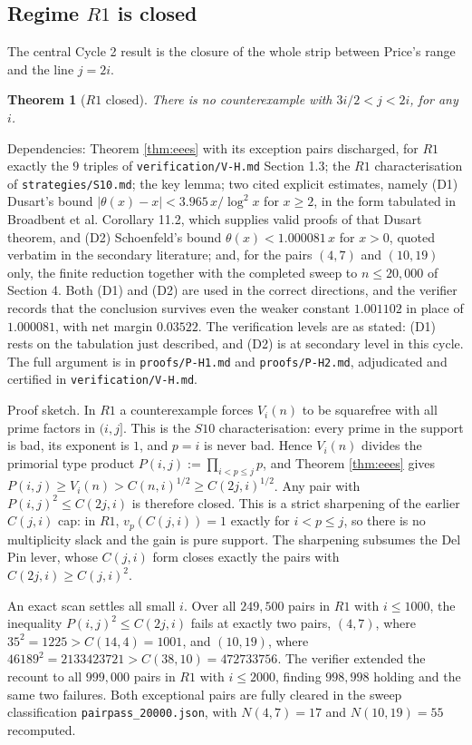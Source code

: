 \documentclass[11pt]{article}
\newtheorem{theorem}{Theorem}[section]
\theoremstyle{remark}
\begin{document}
\subsection{Regime $R1$ is closed}

The central Cycle 2 result is the closure of the whole strip between Price's range and the line $j=2i$.

\begin{theorem}[$R1$ closed]
\label{thm:R1}
There is no counterexample with $3i/2<j<2i$, for any $i$.
\end{theorem}

Dependencies: Theorem \ref{thm:eees} with its exception pairs discharged, for $R1$ exactly the $9$ triples of \texttt{verification/V-H.md} Section 1.3; the $R1$ characterisation of \texttt{strategies/S10.md}; the key lemma; two cited explicit estimates, namely (D1) Dusart's bound $|\theta(x)-x|<3.965\,x/\log^2 x$ for $x\ge 2$, in the form tabulated in Broadbent et al. Corollary 11.2, which supplies valid proofs of that Dusart theorem, and (D2) Schoenfeld's bound $\theta(x)<1.000081\,x$ for $x>0$, quoted verbatim in the secondary literature; and, for the pairs $(4,7)$ and $(10,19)$ only, the finite reduction together with the completed sweep to $n\le 20{,}000$ of Section 4. Both (D1) and (D2) are used in the correct directions, and the verifier records that the conclusion survives even the weaker constant $1.001102$ in place of $1.000081$, with net margin $0.03522$. The verification levels are as stated: (D1) rests on the tabulation just described, and (D2) is at secondary level in this cycle. The full argument is in \texttt{proofs/P-H1.md} and \texttt{proofs/P-H2.md}, adjudicated and certified in \texttt{verification/V-H.md}.

Proof sketch. In $R1$ a counterexample forces $V_i(n)$ to be squarefree with all prime factors in $(i,j]$. This is the $S10$ characterisation: every prime in the support is bad, its exponent is $1$, and $p=i$ is never bad. Hence $V_i(n)$ divides the primorial type product $P(i,j):=\prod_{i<p\le j}p$, and Theorem \ref{thm:eees} gives $P(i,j)\ge V_i(n)>C(n,i)^{1/2}\ge C(2j,i)^{1/2}$. Any pair with $P(i,j)^2\le C(2j,i)$ is therefore closed. This is a strict sharpening of the earlier $C(j,i)$ cap: in $R1$, $v_p(C(j,i))=1$ exactly for $i<p\le j$, so there is no multiplicity slack and the gain is pure support. The sharpening subsumes the Del Pin lever, whose $C(j,i)$ form closes exactly the pairs with $C(2j,i)\ge C(j,i)^2$.

An exact scan settles all small $i$. Over all $249{,}500$ pairs in $R1$ with $i\le 1000$, the inequality $P(i,j)^2\le C(2j,i)$ fails at exactly two pairs, $(4,7)$, where $35^2=1225>C(14,4)=1001$, and $(10,19)$, where $46189^2=2133423721>C(38,10)=472733756$. The verifier extended the recount to all $999{,}000$ pairs in $R1$ with $i\le 2000$, finding $998{,}998$ holding and the same two failures. Both exceptional pairs are fully cleared in the sweep classification \texttt{pairpass\_20000.json}, with $N(4,7)=17$ and $N(10,19)=55$ recomputed.
\end{document}

